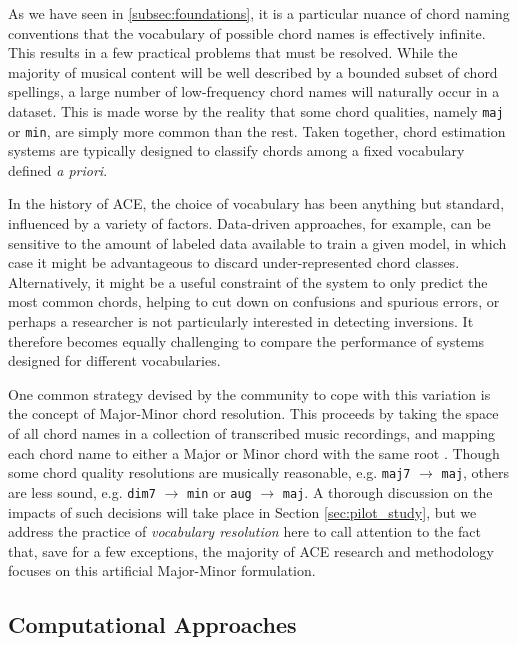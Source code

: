 As we have seen in \ref{subsec:foundations}, it is a particular nuance of chord naming conventions that the vocabulary of possible chord names is effectively infinite.
This results in a few practical problems that must be resolved.
While the majority of musical content will be well described by a bounded subset of chord spellings, a large number of low-frequency chord names will naturally occur in a dataset.
This is made worse by the reality that some chord qualities, namely \texttt{maj} or \texttt{min}, are simply more common than the rest.
Taken together, chord estimation systems are typically designed to classify chords among a fixed vocabulary defined \emph{a priori}.

In the history of ACE, the choice of vocabulary has been anything but standard, influenced by a variety of factors.
Data-driven approaches, for example, can be sensitive to the amount of labeled data available to train a given model, in which case it might be advantageous to discard under-represented chord classes.
Alternatively, it might be a useful constraint of the system to only predict the most common chords, helping to cut down on confusions and spurious errors, or perhaps a researcher is not particularly interested in detecting inversions.
It therefore becomes equally challenging to compare the performance of systems designed for different vocabularies.

One common strategy devised by the community to cope with this variation is the concept of Major-Minor chord resolution.
This proceeds by taking the space of all chord names in a collection of transcribed music recordings, and mapping each chord name to either a Major or Minor chord with the same root \cite{McVicar2013}.
Though some chord quality resolutions are musically reasonable, e.g. \texttt{maj7} $\to$ \texttt{maj}, others are less sound, e.g. \texttt{dim7} $\to$ \texttt{min} or \texttt{aug} $\to$ \texttt{maj}.
A thorough discussion on the impacts of such decisions will take place in Section \ref{sec:pilot_study}, but we address the practice of \emph{vocabulary resolution} here to call attention to the fact that, save for a few exceptions, the majority of ACE research and methodology focuses on this artificial Major-Minor formulation.


\subsection{Computational Approaches}
\label{subsec:computational_approaches}


